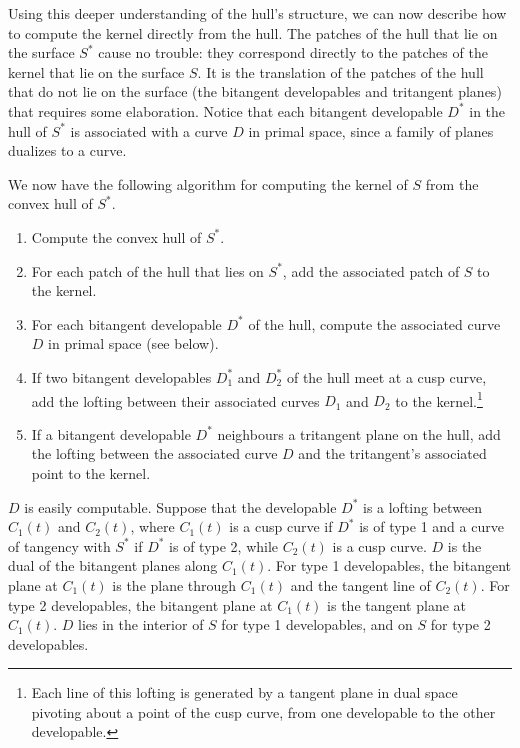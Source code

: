 \documentclass[doublespacing]{elsart}
\begin{document}
Using this deeper understanding of the hull's structure,
we can now describe how to compute the kernel directly from the hull.
The patches of the hull that lie on the surface $S^*$
cause no trouble: they correspond directly
to the patches of the kernel that lie on the surface $S$.
It is the translation of the patches of the hull that do not lie on the surface 
(the bitangent developables and tritangent planes)
that requires some elaboration.
Notice that each bitangent developable $D^*$ in the hull of $S^*$ 
is associated with a curve $D$ in primal space, since a family of planes dualizes to a curve.

We now have the following algorithm for computing the kernel of $S$ 
from the convex hull of $S^*$.

\begin{enumerate}
\item Compute the convex hull of $S^*$.
\item For each patch of the hull that lies on $S^*$, add the associated patch of $S$
	to the kernel.
\item For each bitangent developable $D^*$ of the hull, compute the associated curve $D$ in primal space
  (see below).
\item If two bitangent developables $D_1^*$ and $D_2^*$ of the hull meet at a cusp curve, 
  add the lofting between their associated curves $D_1$ and $D_2$ to the kernel.\footnote{
    Each line of this lofting is generated by a tangent plane in dual space pivoting 
    about a point of the cusp curve, from one developable to the other developable.}
\item If a bitangent developable $D^*$ neighbours a tritangent plane on the hull,
	add the lofting between the associated curve $D$ and the tritangent's 
	associated point to the kernel.
\end{enumerate}

$D$ is easily computable.
Suppose that the developable $D^*$ is a lofting between $C_1(t)$ and $C_2(t)$,
where $C_1(t)$ is a cusp curve if $D^*$ is of type 1 and
a curve of tangency with $S^*$ if $D^*$ is of type 2,
while $C_2(t)$ is a cusp curve.
$D$ is the dual of the bitangent planes along $C_1(t)$.
For type 1 developables, the bitangent plane at $C_1(t)$ is the plane through
$C_1(t)$ and the tangent line of $C_2(t)$.
For type 2 developables, the bitangent plane at $C_1(t)$ is the tangent plane
at $C_1(t)$.
$D$ lies in the interior of $S$ for type 1 developables,
and on $S$ for type 2 developables.
\end{document}
